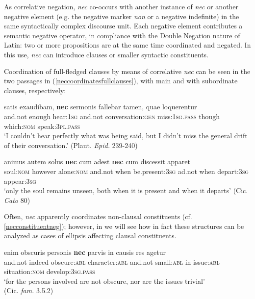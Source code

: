 \documentclass[output=paper,modfonts,nonflat,citecolor=brown,
showindex
]{langsci/langscibook}
\begin{document}
As correlative negation, {\emph{nec}} co-occurs with another instance of {\emph{nec}} or another negative element (e.g. the negative marker {\emph{non}} or a negative indefinite) in the same syntactically complex discourse unit. Each negative element contributes a semantic negative operator, in compliance with the Double Negation nature of Latin: two or more propositions are at the same time coordinated and negated. In this use, {\emph{nec}} can introduce clauses or smaller syntactic constituents. 

Coordination of full-fledged clauses by means of correlative {\emph{nec}} can be seen in the two passages in (\ref{neccoordinatesfullclauses}), with main and with subordinate clauses, respectively:

{\begin{exe}
\ex \label{neccoordinatesfullclauses}
\begin{xlist}
\ex {} satis exaudibam, {\textbf{nec}} sermonis fallebar tamen, quae loquerentur\\
and.not enough hear:{\textsc{1sg}} and.not conversation:{\textsc{gen}} miss:{\textsc{1sg.pass}} though which:{\textsc{nom}} speak:{\textsc{3pl.pass}} \\

`I couldn't hear perfectly what was being said, but I didn't miss the general drift of their conversation.' (Plaut. {\emph{Epid.}} 239-240)

\ex \gll animus autem solus {\textbf{nec}} cum adest {\textbf{nec}} cum discessit apparet\\
soul:{\textsc{nom}} however alone:{\textsc{nom}} and.not when be.present:{\textsc{3sg}} ad.not when depart:{\textsc{3sg}} appear:{\textsc{3sg}}\\

`only the soul remains unseen, both when it is present and when it departs' (Cic. {\emph{Cato}} 80)
\end{xlist}
\end{exe}}


\noindent Often, {\emph{nec}} apparently coordinates non-clausal constituents (cf. \ref{necconstituentneg}); however, in  we will see how in fact these structures can be analyzed as cases of ellipsis affecting clausal constituents. 

{\begin{exe}
\ex \label{necconstituentneg}  enim obscuris personis {\textbf{nec}} parvis in causis res agetur\\
and.not indeed obscure:{\textsc{abl}} character:{\textsc{abl}} and.not small:{\textsc{abl}} in issue:{\textsc{abl}} situation:{\textsc{nom}} develop:{\textsc{3sg.pass}}\\

`for the persons involved are not obscure, nor are the issues trivial'\\(Cic. {\emph{fam.}} 3.5.2)
\end{exe}}
\end{document}
